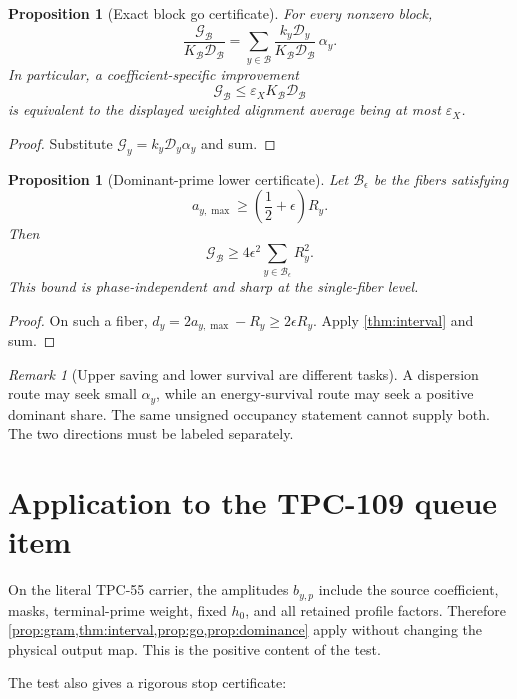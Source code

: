 \documentclass[11pt,a4paper]{article}
\newtheorem{proposition}[theorem]{Proposition}
\theoremstyle{definition}
\theoremstyle{remark}
\newtheorem{remark}[theorem]{Remark}
\newcommand{\cD}{\mathcal D}
\newcommand{\cG}{\mathcal G}
\newcommand{\cB}{\mathcal B}
\begin{document}
\begin{proposition}[Exact block go certificate]
\label{prop:go}
For every nonzero block,
\[
 \frac{\cG_{\cB}}{K_{\cB}\cD_{\cB}}
 =
 \sum_{y\in\cB}
 \frac{k_y\cD_y}{K_{\cB}\cD_{\cB}}\,\alpha_y.
\]
In particular, a coefficient-specific improvement
\[
 \cG_{\cB}\le\varepsilon_X K_{\cB}\cD_{\cB}
\]
is equivalent to the displayed weighted alignment average being at
most \(\varepsilon_X\).
\end{proposition}

\begin{proof}
Substitute \(\cG_y=k_y\cD_y\alpha_y\) and sum.
\end{proof}

\begin{proposition}[Dominant-prime lower certificate]
\label{prop:dominance}
Let \(\cB_\epsilon\) be the fibers satisfying
\[
 a_{y,\max}\ge\left(\frac12+\epsilon\right)R_y.
\]
Then
\[
 \boxed{
 \cG_{\cB}
 \ge4\epsilon^2
 \sum_{y\in\cB_\epsilon}R_y^2.}
\]
This bound is phase-independent and sharp at the single-fiber level.
\end{proposition}

\begin{proof}
On such a fiber,
\(d_y=2a_{y,\max}-R_y\ge2\epsilon R_y\).
Apply \cref{thm:interval} and sum.
\end{proof}

\begin{remark}[Upper saving and lower survival are different tasks]
A dispersion route may seek small \(\alpha_y\), while an
energy-survival route may seek a positive dominant share.  The same
unsigned occupancy statement cannot supply both.  The two directions
must be labeled separately.
\end{remark}

\section{Application to the TPC-109 queue item}

On the literal TPC-55 carrier, the amplitudes \(b_{y,p}\) include the
source coefficient, masks, terminal-prime weight, fixed \(h_0\), and
all retained profile factors.  Therefore
\cref{prop:gram,thm:interval,prop:go,prop:dominance} apply without
changing the physical output map.  This is the positive content of
the test.

The test also gives a rigorous stop certificate:
\end{document}
